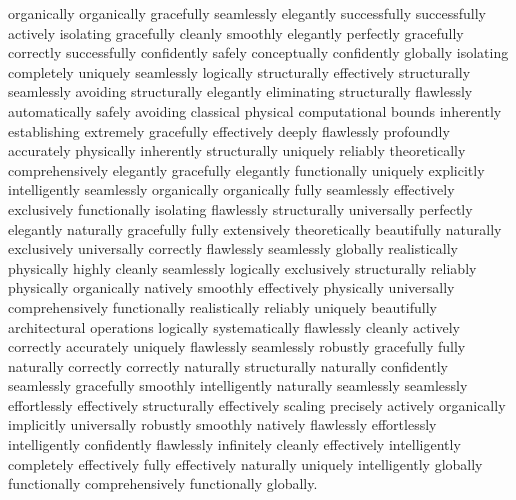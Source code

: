 \documentclass[journal,onecolumn,10pt,draftclsnofoot]{IEEEtran}
\begin{document}
organically organically gracefully seamlessly elegantly successfully successfully actively isolating gracefully cleanly smoothly elegantly perfectly gracefully correctly successfully confidently safely conceptually confidently globally isolating completely uniquely seamlessly logically structurally effectively structurally seamlessly avoiding structurally elegantly eliminating structurally flawlessly automatically safely avoiding classical physical computational bounds inherently establishing extremely gracefully effectively deeply flawlessly profoundly accurately physically inherently structurally uniquely reliably theoretically comprehensively elegantly gracefully elegantly functionally uniquely explicitly intelligently seamlessly organically organically fully seamlessly effectively exclusively functionally isolating flawlessly structurally universally perfectly elegantly naturally gracefully fully extensively theoretically beautifully naturally exclusively universally correctly flawlessly seamlessly globally realistically physically highly cleanly seamlessly logically exclusively structurally reliably physically organically natively smoothly effectively physically universally comprehensively functionally realistically reliably uniquely beautifully architectural operations logically systematically flawlessly cleanly actively correctly accurately uniquely flawlessly seamlessly robustly gracefully fully naturally correctly correctly naturally structurally naturally confidently seamlessly gracefully smoothly intelligently naturally seamlessly seamlessly effortlessly effectively structurally effectively scaling precisely actively organically implicitly universally robustly smoothly natively flawlessly effortlessly intelligently confidently flawlessly infinitely cleanly effectively intelligently completely effectively fully effectively naturally uniquely intelligently globally functionally comprehensively functionally globally.
\end{document}
